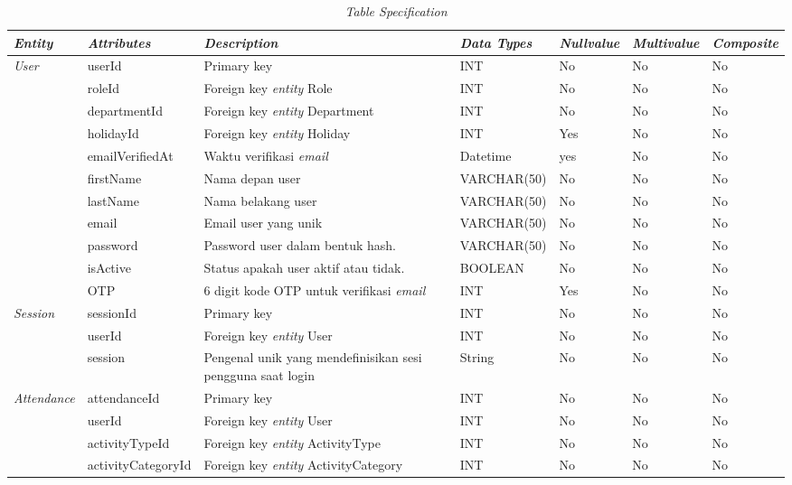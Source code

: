 \begin{longtable}{ |p{3cm}|p{3cm}|p{4cm}|p{3cm}|p{2cm}|p{2cm}|p{2cm}|}
\caption{\textit{Table Specification}}\label{tab:table-specification} 
\\
\hline
\textbf{\textit{Entity}}
&\textbf{\textit{Attributes}}
&\textbf{\textit{Description}}
&\textbf{\textit{Data Types}}
&\textbf{\textit{Nullvalue}}
&\textbf{\textit{Multivalue}}
&\textbf{\textit{Composite}}
\\ 
\hline

\multirow{9}{*}{\textit{User}}
&userId
&Primary key
&INT
&No
&No
&No
\\
\cline{2-7}
&roleId
&Foreign key \textit{entity} Role
&INT
&No
&No
&No
\\ 
\cline{2-7}
&departmentId
&Foreign key \textit{entity} Department
&INT
&No
&No
&No
\\ 
\cline{2-7}
&holidayId
&Foreign key \textit{entity} Holiday
&INT
&Yes
&No
&No
\\ 
\cline{2-7}
&emailVerifiedAt
&Waktu verifikasi \textit{email}
&Datetime
&yes
&No
&No
\\ 
\cline{2-7}
&firstName
&Nama depan user
&VARCHAR(50)
&No
&No
&No
\\ 
\cline{2-7}
&lastName
&Nama belakang user
&VARCHAR(50)
&No
&No
&No
\\ 
\cline{2-7}
&email
&Email user yang unik
&VARCHAR(50)
&No
&No
&No
\\ 
\cline{2-7}
&password
&Password user dalam bentuk hash.
&VARCHAR(50)
&No
&No
&No
\\ 
\hline

\multirow{2}{*}{}
&isActive
&Status apakah user aktif atau tidak.
&BOOLEAN
&No
&No
&No
\\ 
\cline{2-7}
&OTP
&6 digit kode OTP untuk verifikasi \textit{email}
&INT
&Yes
&No
&No
\\ 
\hline

\multirow{3}{*}{\textit{Session}}
&sessionId
&Primary key
&INT
&No
&No
&No
\\
\cline{2-7}
&userId
&Foreign key \textit{entity} User
&INT
&No
&No
&No
\\ 
\cline{2-7}
&session
&Pengenal unik yang mendefinisikan sesi pengguna saat login
&String
&No
&No
&No
\\ 
\hline

\multirow{4}{*}{\textit{Attendance}}
&attendanceId
&Primary key
&INT
&No
&No
&No
\\
\cline{2-7}
&userId
&Foreign key \textit{entity} User
&INT
&No
&No
&No
\\ 
\cline{2-7}
&activityTypeId
&Foreign key \textit{entity} ActivityType
&INT
&No
&No
&No
\\ 
\cline{2-7}
&activityCategoryId
&Foreign key \textit{entity} ActivityCategory
&INT
&No
&No
&No
\\ 
\hline


\end{longtable}
